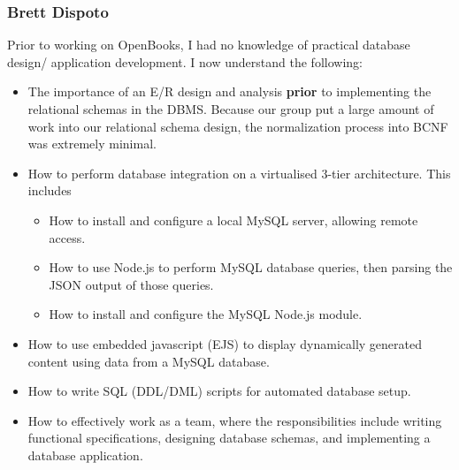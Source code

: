 \documentclass[letter, 12pt, titlepage]{article}
\begin{document}
\subsubsection{Brett Dispoto}
Prior to working on OpenBooks, I had no knowledge of practical database design/ application development. I now understand the following:
\begin{itemize}
	\item The importance of an E/R design and analysis \textbf{prior} to implementing the relational schemas in the DBMS. Because our group put a large amount of work into our relational schema design, the normalization process into BCNF was extremely minimal.
	\item How to perform database integration on a virtualised 3-tier architecture. This includes
	      \begin{itemize}
		      \item How to install and configure a local MySQL server, allowing remote access.
		      \item How to use Node.js to perform MySQL database queries, then parsing the JSON output of those queries.
		      \item How to install and configure the MySQL Node.js module.
	      \end{itemize}
	\item How to use embedded javascript (EJS) to display dynamically generated content using data from a MySQL database.
	\item How to write SQL (DDL/DML) scripts for automated database setup.
	\item How to effectively work as a team, where the responsibilities include writing functional specifications,  designing database schemas, and implementing a database application.
\end{itemize}
\end{document}
